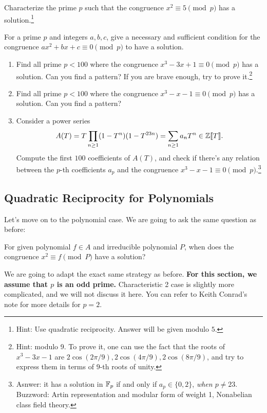 \begin{exercise}
    Characterize the prime $p$ such that the congruence $x^2 \equiv 5 \pmod{p}$ has a solution.\footnote{Hint: Use quadratic reciprocity. Answer will be given modulo $5$.}
\end{exercise}

\begin{exercise}
    For a prime $p$ and integers $a, b, c$, give a necessary and sufficient condition for the congruence $ax^2 + bx + c \equiv 0 \pmod{p}$ to have a solution.
\end{exercise}

\begin{exercise}
    \begin{enumerate}
        \item Find all prime $p < 100$ where the congruence $x^3 - 3x + 1 \equiv 0 \pmod{p}$ has a solution. Can you find a pattern? If you are brave enough, try to prove it.\footnote{Hint: modulo 9. To prove it, one can use the fact that the roots of $x^3 - 3x - 1$ are $2\cos (2\pi / 9), 2 \cos(4\pi/9), 2\cos(8\pi / 9)$, and try to express them in terms of $9$-th roots of unity.}
        \item Find all prime $p < 100$ where the congruence $x^3 - x - 1 \equiv 0 \pmod{p}$ has a solution. Can you find a pattern?
        \item Consider a power series
        \[
        A(T) = T \prod_{n \ge 1} (1 - T^n) (1 - T^{23 n}) = \sum_{n\ge 1} a_n T^n \in \mathbb{Z}\llbracket T \rrbracket.
        \]
        Compute the first $100$ coefficients of $A(T)$, and check if there's any relation between the $p$-th coefficients $a_p$ and the congruence $x^3 - x - 1 \equiv 0 \pmod{p}$.\footnote{Asnwer: it has a solution in $\mathbb{F}_p$ if and only if $a_p \in \{0, 2\}$, \emph{when $p \ne 23$}. Buzzword: Artin representation and modular form of weight 1, Nonabelian class field theory.}
    \end{enumerate}    
\end{exercise}


\subsection{Quadratic Reciprocity for Polynomials}
\label{subsec:quadratic-reciprocity-polynomials}

Let's move on to the polynomial case.
We are going to ask the same question as before:
\begin{myquote}
For given polynomial $f \in A$ and irreducible polynomial $P$, when does the congruence $x^2 \equiv f \pmod{P}$ have a solution?
\end{myquote}
We are going to adapt the exact same strategy as before.
\textbf{For this section, we assume that $p$ is an odd prime.}
Characteristic 2 case is slightly more complicated, and we will not discuss it here.
You can refer to Keith Conrad's note \cite{conrad_rec_2} for more details for $p = 2$.

